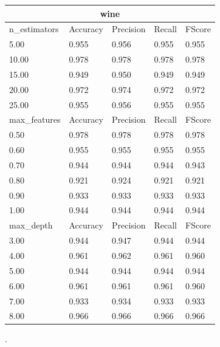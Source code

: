\documentclass[12pt,a4paper]{article}
\begin{document}
\begin{tabular}{ |p{3cm}||p{2cm}|p{2cm}|p{2cm}|p{2cm}| }
\hline
\multicolumn{5}{|c|}{wine}\\
\hline
n\_estimators & Accuracy & Precision & Recall & FScore \\
\hline
5.00 & 0.955 & 0.956 & 0.955 & 0.955\\
10.00 & 0.978 & 0.978 & 0.978 & 0.978\\
15.00 & 0.949 & 0.950 & 0.949 & 0.949\\
20.00 & 0.972 & 0.974 & 0.972 & 0.972\\
25.00 & 0.955 & 0.956 & 0.955 & 0.955\\
\hline
max\_features & Accuracy & Precision & Recall & FScore \\
\hline
0.50 & 0.978 & 0.978 & 0.978 & 0.978\\
0.60 & 0.955 & 0.955 & 0.955 & 0.955\\
0.70 & 0.944 & 0.944 & 0.944 & 0.943\\
0.80 & 0.921 & 0.924 & 0.921 & 0.921\\
0.90 & 0.933 & 0.933 & 0.933 & 0.933\\
1.00 & 0.944 & 0.944 & 0.944 & 0.944\\
\hline
max\_depth & Accuracy & Precision & Recall & FScore \\
\hline
3.00 & 0.944 & 0.947 & 0.944 & 0.944\\
4.00 & 0.961 & 0.962 & 0.961 & 0.960\\
5.00 & 0.944 & 0.944 & 0.944 & 0.944\\
6.00 & 0.961 & 0.961 & 0.961 & 0.960\\
7.00 & 0.933 & 0.934 & 0.933 & 0.933\\
8.00 & 0.966 & 0.966 & 0.966 & 0.966\\
\hline
\end{tabular}
.\\
\end{document}
